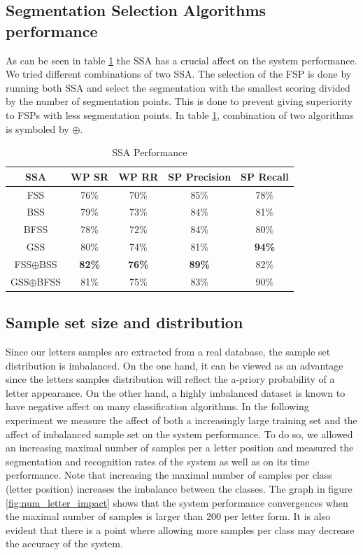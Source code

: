 \documentclass[10pt, conference, compsocconf]{IEEEtran}
\begin{document}
\subsection{Segmentation Selection Algorithms performance}
\label{subsec:ssa_performance}
As can be seen in table \ref{table:ss_algorithms_results} the SSA has a crucial affect on the system performance. We tried different combinations of two SSA. The selection of the FSP is done by running both SSA and select the segmentation with the smallest scoring divided by the number of segmentation points. This is done to prevent giving superiority to FSPs with less segmentation points. In table \ref{table:ss_algorithms_results}, combination of two algorithms is symboled by $\oplus$.

\begin{table}[h]
\caption{SSA Performance}
\begin{tabular}{ | c | c | c | c | c |}
\hline
SSA & WP SR & WP RR & SP Precision & SP Recall\\
\hline                 
  FSS & 76\% & 70\% & 85\% & 78\% \\ 
  \hline
  BSS & 79\% &  73\% & 84\%& 81\% \\
  \hline
  BFSS & 78\% & 72\% & 84\% & 80\%\\ 
  \hline
  GSS & 80\% & 74\% & 81\% & \bf{94}\% \\  
  \hline
  FSS$\oplus$BSS & \bf{82}\% & \bf{76}\% & \bf{89}\% & 82\%\\  
  \hline
  GSS$\oplus$BFSS & 81\% & 75\% & 83\% & 90\% \\
  \hline
\end{tabular}
\centering
\label{table:ss_algorithms_results} 
\end{table}

\subsection{Sample set size and distribution}
Since our letters samples are extracted from a real database, the sample set distribution is imbalanced. 
On the one hand, it can be viewed as an advantage since the letters samples distribution will reflect the a-priory probability of a letter appearance. 
On the other hand, a highly imbalanced dataset is known to have negative affect on many classification algorithms.
In the following experiment we measure the affect of both a increasingly large training set and the affect of imbalanced sample set on the system performance.
To do so, we allowed an increasing maximal number of samples per a letter position and measured the segmentation and recognition rates of the system as well as on its time performance. 
Note that increasing the maximal number of samples per class (letter position) increases the imbalance between the classes. 
The graph in figure \ref{fig:num_letter_impact} shows that the system performance convergences when the maximal number of samples is larger than 200 per letter form. 
It is also evident that there is a point where allowing more samples per class may decrease the accuracy of the system.
\end{document}

